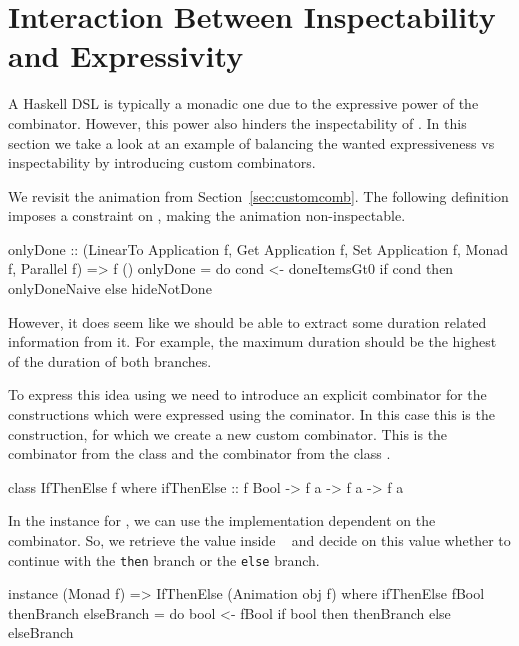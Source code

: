 \section{Interaction Between Inspectability and Expressivity}
\label{sec:interaction}

A Haskell DSL is typically a monadic one due to the expressive power of the \hs{>>=} combinator. However, this power also hinders the inspectability of \dsl{}. In this section we take a look at an example of balancing the wanted expressiveness vs inspectability by introducing custom combinators.

We revisit the  animation from Section~\ref{sec:customcomb}. The following definition imposes a  constraint on , making the animation non-inspectable.

\begin{spec}
onlyDone :: (LinearTo Application f, Get Application f,
  Set Application f, Monad f, Parallel f) => f ()
onlyDone = do
  cond <- doneItemsGt0
  if cond then onlyDoneNaive else hideNotDone
\end{spec}

However, it does seem like we should be able to extract some duration related information from it. For example, the maximum duration should be the highest of the duration of both branches.

To express this idea using \dsl{} we need to introduce an explicit combinator for the constructions which were expressed using the \hs{>>=} cominator. In this case this is the  construction, for which we create a new custom combinator. This is the  combinator from the  class \cite{DBLP:phd/ethos/Yallop10} and the  combinator from the  class \cite{Mokhov:2019:SAF:3352468.3341694}.

\begin{code}
class IfThenElse f where
  ifThenElse :: f Bool -> f a -> f a -> f a
\end{code}

In the instance for , we can use the implementation dependent on the \hs{>>=} combinator. So, we retrieve the value inside ~ and decide on this value whether to continue with the \texttt{then} branch or the \texttt{else} branch.

\begin{code}
instance (Monad f) => IfThenElse (Animation obj f) where
  ifThenElse fBool thenBranch elseBranch = do
    bool <- fBool
    if bool then thenBranch else elseBranch
\end{code}

